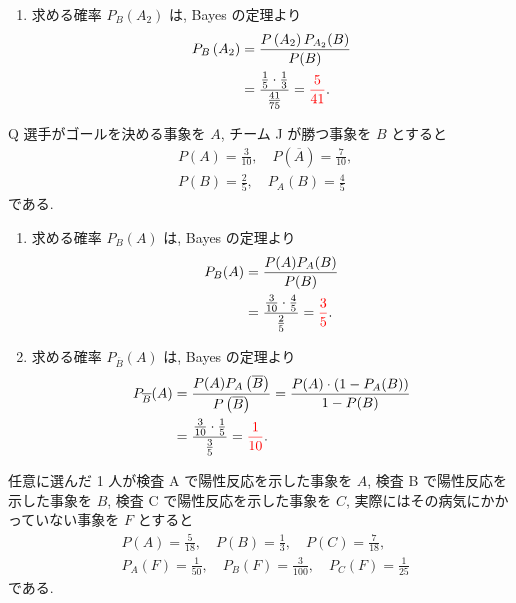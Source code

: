 \begin{qenumerate}
{\begin{enumerate}
{\begin{align}
						&= \red{\frac{41}{75}}.
				\end{align}
			}
			\item{
				求める確率 $P_{B}\left(A_{2}\right)$ は, Bayes の定理より
				\begin{align}
					P_{B}\left(A_{2}\right) &= \frac{P\left(A_{2}\right)P_{A_{2}}(B)}{P(B)} \\
						&= \frac{\frac{1}{5}\cdot\frac{1}{3}}{\frac{41}{75}} = \textcolor{red}{\frac{5}{41}}.
				\end{align}
			}
		\end{enumerate}
	}
	\item{
		Q 選手がゴールを決める事象を $A$, チーム J が勝つ事象を $B$ とすると
		\begin{align}
			& P(A) = \frac{3}{10}, \quad P\left(\overline{A}\right) = \frac{7}{10}, \\
			& P(B) = \frac{2}{5}, \quad P_{A}(B) = \frac{4}{5}
		\end{align}
		である.
		\begin{enumerate}
			\item{
				求める確率 $P_{B}(A)$ は, Bayes の定理より
				\begin{align}
					P_{B}(A) &= \frac{P(A)P_{A}(B)}{P(B)} \\
						&= \frac{\frac{3}{10}\cdot\frac{4}{5}}{\frac{2}{5}} = \textcolor{red}{\frac{3}{5}}.
				\end{align}
			}
			\item{
				求める確率 $P_{\overline{B}}(A)$ は, Bayes の定理より
				\begin{align}
					P_{\overline{B}}(A) &= \frac{P(A)P_{A}\left(\overline{B}\right)}{P\left(\overline{B}\right)} = \frac{P(A)\cdot\left(1 - P_{A}(B)\right)}{1 - P(B)} \\
						&= \frac{\frac{3}{10}\cdot\frac{1}{5}}{\frac{3}{5}} = \textcolor{red}{\frac{1}{10}}.
				\end{align}
			}
		\end{enumerate}
	}
	\item{
		任意に選んだ 1 人が検査 A で陽性反応を示した事象を $A$, 検査 B で陽性反応を示した事象を $B$, 検査 C で陽性反応を示した事象を $C$, 実際にはその病気にかかっていない事象を $F$ とすると
		\begin{align}
			& P(A) = \frac{5}{18}, \quad P(B) = \frac{1}{3}, \quad P(C) = \frac{7}{18}, \\
			& P_{A}(F) = \frac{1}{50}, \quad P_{B}(F) = \frac{3}{100}, \quad P_{C}(F) = \frac{1}{25}
		\end{align}
		である.
		\begin{enumerate}

\end{enumerate}}
\end{qenumerate}
